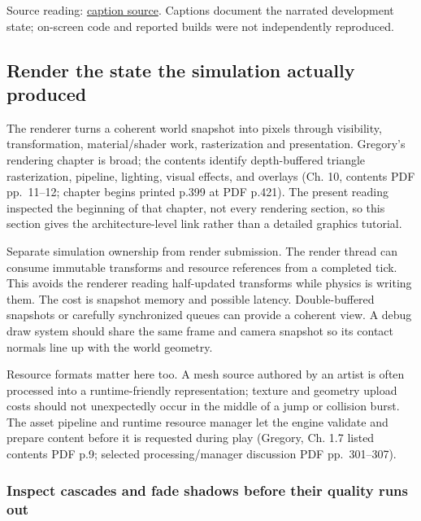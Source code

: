 Source reading: \href{https://www.youtube.com/watch?v=xGonaV-OB7E}{caption source}. Captions document the narrated development state; on-screen code and reported builds were not independently reproduced.

\subsection{Render the state the simulation actually produced}\label{06-engine-ii-ch026-render-the-state-the-simulation-actually-produced}

\hypertarget{06-engine-ii-ch026-render-the-state-the-simulation-actually-produced}{}

The renderer turns a coherent world snapshot into pixels through visibility, transformation, material/shader work, rasterization and presentation. Gregory's rendering chapter is broad; the contents identify depth-buffered triangle rasterization, pipeline, lighting, visual effects, and overlays (Ch. 10, contents PDF pp.~11--12; chapter begins printed p.399 at PDF p.421). The present reading inspected the beginning of that chapter, not every rendering section, so this section gives the architecture-level link rather than a detailed graphics tutorial.

Separate simulation ownership from render submission. The render thread can consume immutable transforms and resource references from a completed tick. This avoids the renderer reading half-updated transforms while physics is writing them. The cost is snapshot memory and possible latency. Double-buffered snapshots or carefully synchronized queues can provide a coherent view. A debug draw system should share the same frame and camera snapshot so its contact normals line up with the world geometry.

Resource formats matter here too. A mesh source authored by an artist is often processed into a runtime-friendly representation; texture and geometry upload costs should not unexpectedly occur in the middle of a jump or collision burst. The asset pipeline and runtime resource manager let the engine validate and prepare content before it is requested during play (Gregory, Ch. 1.7 listed contents PDF p.9; selected processing/manager discussion PDF pp.~301--307).

\subsubsection{Inspect cascades and fade shadows before their quality runs out}\label{06-engine-ii-ch026-inspect-cascades-and-fade-shadows-before-their-quality-runs-out}

